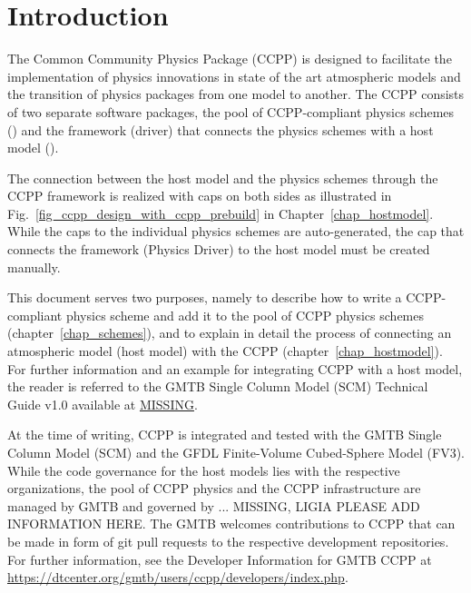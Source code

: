 \chapter{Introduction}\label{chap_introduction}
\setlength{\parskip}{12pt}

The Common Community Physics Package (CCPP) is designed to facilitate the implementation of physics innovations in state of the art atmospheric models and the transition of physics packages from one model to another. The CCPP consists of two separate software packages, the pool of CCPP-compliant physics schemes () and the framework (driver) that connects the physics schemes with a host model ().

The connection between the host model and the physics schemes through the CCPP framework is realized with caps on both sides as illustrated in Fig.~\ref{fig_ccpp_design_with_ccpp_prebuild} in Chapter~\ref{chap_hostmodel}. While the caps to the individual physics schemes are auto-generated, the cap that connects the framework (Physics Driver) to the host model must be created manually.

This document serves two purposes, namely to describe how to write a CCPP-compliant physics scheme and add it to the pool of CCPP physics schemes (chapter~\ref{chap_schemes}), and to explain in detail the process of connecting an atmospheric model (host model) with the CCPP (chapter~\ref{chap_hostmodel}). For further information and an example for integrating CCPP with a host model, the reader is referred to the GMTB Single Column Model (SCM) Technical Guide v1.0 available at {\red\url{MISSING}}.

At the time of writing, CCPP is integrated and tested with the GMTB Single Column Model (SCM) and the GFDL Finite-Volume Cubed-Sphere Model (FV3). While the code governance for the host models lies with the respective organizations, the pool of CCPP physics and the CCPP infrastructure are managed by GMTB and governed by ... {\red MISSING, LIGIA PLEASE ADD INFORMATION HERE}. The GMTB welcomes contributions to CCPP that can be made in form of git pull requests to the respective development repositories. For further information, see the Developer Information for GMTB CCPP at \url{https://dtcenter.org/gmtb/users/ccpp/developers/index.php}.
